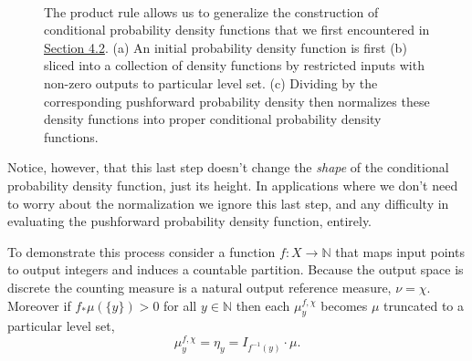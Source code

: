 \documentclass[
  letterpaper,
  DIV=11,
  numbers=noendperiod]{scrartcl}
\begin{document}
\begin{figure}
\begin{minipage}{0.45\linewidth}
{}

\subcaption{\label{fig-continuous-conditional-renormalized}}

\end{minipage}%
%
\begin{minipage}{0.28\linewidth}
~\end{minipage}%

\caption{\label{fig-continuous-conditional}The product rule allows us to
generalize the construction of conditional probability density functions
that we first encountered in
\hyperref[sec:discrete-conditional-density]{Section 4.2}. (a) An initial
probability density function is first (b) sliced into a collection of
density functions by restricted inputs with non-zero outputs to
particular level set. (c) Dividing by the corresponding pushforward
probability density then normalizes these density functions into proper
conditional probability density functions.}

\end{figure}%

Notice, however, that this last step doesn't change the \emph{shape} of
the conditional probability density function, just its height. In
applications where we don't need to worry about the normalization we
ignore this last step, and any difficulty in evaluating the pushforward
probability density function, entirely.

To demonstrate this process consider a function
\(f : X \rightarrow \mathbb{N}\) that maps input points to output
integers and induces a countable partition. Because the output space is
discrete the counting measure is a natural output reference measure,
\(\nu = \chi\). Moreover if \(f_{*} \mu( \{ y \} ) > 0\) for all
\(y \in \mathbb{N}\) then each \(\mu^{f, \chi}_{y}\) becomes \(\mu\)
truncated to a particular level set, \[
\mu^{f, \chi}_{y} = \eta_{y} = I_{f^{-1}(y)} \cdot \mu.
\]
\end{document}

